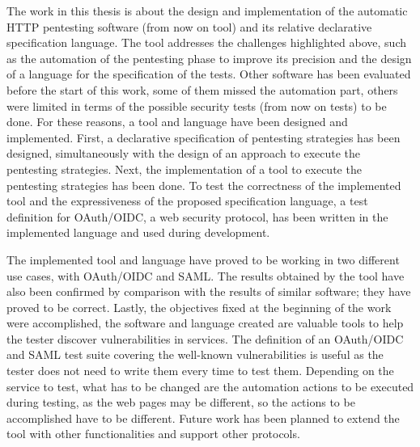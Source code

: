 The work in this thesis is about the design and implementation of the automatic HTTP pentesting software (from now on tool) and its relative declarative specification language. The tool addresses the challenges highlighted above, such as the automation of the pentesting phase to improve its precision and the design of a language for the specification of the tests. Other software has been evaluated before the start of this work, some of them missed the automation part, others were limited in terms of the possible security tests (from now on tests) to be done. For these reasons, a tool and language have been designed and implemented. First, a declarative specification of pentesting strategies has been designed, simultaneously with the design of an approach to execute the pentesting strategies. Next, the implementation of a tool to execute the pentesting strategies has been done. To test the correctness of the implemented tool and the expressiveness of the proposed specification language, a test definition for \gls{OAuth}/OIDC, a web security protocol, has been written in the implemented language and used during development.

The implemented tool and language have proved to be working in two different use cases, with OAuth/OIDC and SAML. The results obtained by the tool have also been confirmed by comparison with the results of similar software; they have proved to be correct. Lastly, the objectives fixed at the beginning of the work were accomplished, the software and language created are valuable tools to help the tester discover vulnerabilities in services. The definition of an OAuth/OIDC and SAML test suite covering the well-known vulnerabilities is useful as the tester does not need to write them every time to test them. Depending on the service to test, what has to be changed are the automation actions to be executed during testing, as the web pages may be different, so the actions to be accomplished have to be different. Future work has been planned to extend the tool with other functionalities and support other protocols. 






